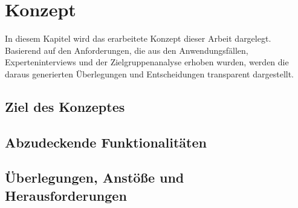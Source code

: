 \chapter{Konzept}
\label{chap:konzept}
    In diesem Kapitel wird das erarbeitete Konzept dieser Arbeit dargelegt. Basierend auf den 
    Anforderungen, die aus den Anwendungsfällen, Experteninterviews und der Zielgruppenanalyse 
    erhoben wurden, werden die daraus generierten Überlegungen und Entscheidungen transparent 
    dargestellt. 

\section{Ziel des Konzeptes}

\section{Abzudeckende Funktionalitäten}

\section{Überlegungen, Anstöße und Herausforderungen}


